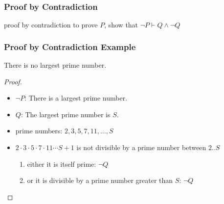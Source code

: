 \documentclass[dvipsnames]{beamer}
\begin{document}
\begin{frame}
  \frametitle{Proof by Contradiction}

  \begin{block}{proof by contradiction}
    to prove $P$, show that $\neg P \vdash Q \wedge \neg Q$
  \end{block}
\end{frame}

\begin{frame}
  \frametitle{Proof by Contradiction Example}

  \begin{theorem}
    There is no largest prime number.
  \end{theorem}

  \pause
  \begin{proof}
    \begin{itemize}
      \item $\neg P$: There is a largest prime number.

      \pause
      \item $Q$: The largest prime number is $S$.

      \pause
      \item prime numbers: $2,3,5,7,11,\dots,S$

      \pause
      \item $2 \cdot 3 \cdot 5 \cdot 7 \cdot 11 \cdots S + 1$ is not divisible
        by a prime number between $2..S$
      \pause
      \begin{enumerate}
        \item either it is itself prime: $\neg Q$

        \pause
        \item or it is divisible by a prime number greater than $S$: $\neg Q$
      \end{enumerate}
    \end{itemize}
  \end{proof}
\end{frame}
\end{document}
